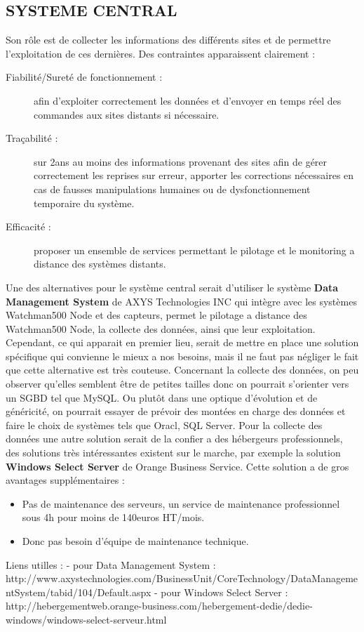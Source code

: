 \documentclass{article}
\begin{document}
\subsection{SYSTEME CENTRAL}
		Son rôle est de collecter les informations des différents sites et de permettre l'exploitation de ces dernières.
		Des contraintes apparaissent clairement : 
		\begin{description}
				\item[Fiabilité/Sureté de fonctionnement :] afin d'exploiter correctement les données et d'envoyer en temps réel des commandes aux sites distants si nécessaire.
				\item[Traçabilité :] sur 2ans au moins des informations provenant des sites afin de gérer correctement les reprises sur erreur, apporter les corrections nécessaires en cas de fausses manipulations humaines ou de dysfonctionnement temporaire du système.
				\item[Efficacité :] proposer un ensemble de services permettant le pilotage et le monitoring a distance des systèmes distants.
		\end{description}

		Une des alternatives pour le système central serait d'utiliser le système \textbf{Data Management System} de AXYS Technologies INC qui intègre avec les systèmes Watchman500 Node et des capteurs, permet le pilotage a distance des Watchman500 Node, la collecte des données, ainsi que leur exploitation.
		Cependant, ce qui apparait en premier lieu, serait de mettre en place une solution spécifique qui convienne le mieux a nos besoins, mais il ne faut pas négliger le fait que cette alternative est très couteuse.
		Concernant la collecte des données, on peu observer qu'elles semblent être de petites tailles donc on pourrait s'orienter vers un SGBD tel que MySQL. Ou plutôt dans une optique d'évolution et de généricité, on pourrait essayer de prévoir des montées en charge des données et faire le choix de systèmes tels que Oracl, SQL Server.
		Pour la collecte des données une autre solution serait de la confier a des hébergeurs professionnels, des solutions très intéressantes existent sur le marche, par exemple la solution \textbf{Windows Select Server} de Orange Business Service. Cette solution a de gros avantages supplémentaires :
		\begin{itemize}
				\item Pas de maintenance des serveurs, un service de maintenance professionnel sous 4h pour moins de 140euros HT/mois.
				\item Donc pas besoin d'équipe de maintenance technique.
		\end{itemize}

Liens utilles : 
- pour Data Management System : http://www.axystechnologies.com/BusinessUnit/CoreTechnology/DataManagementSystem/tabid/104/Default.aspx
- pour Windows Select Server : http://hebergementweb.orange-business.com/hebergement-dedie/dedie-windows/windows-select-serveur.html
\end{document}
